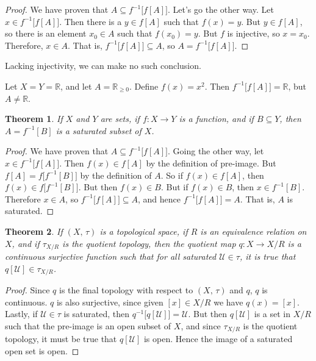 \documentclass{article}
\theoremstyle{plain}
\newtheorem{theorem}{Theorem}[section]
\theoremstyle{normal}
\newenvironment{example}{%
    \pushQED{\qed}\renewcommand{\qedsymbol}{$\blacksquare$}\examplex%
}{%
    \popQED\endexamplex%
}
\begin{document}
        \begin{proof}
            We have proven that $A\subseteq{f}^{-1}\big[f[A]\big]$. Let's go
            the other way. Let $x\in{f}^{-1}\big[f[A]\big]$. Then there is
            a $y\in{f}[A]$ such that $f(x)=y$. But $y\in{f}[A]$, so there is an
            element $x_{0}\in{A}$ such that $f(x_{0})=y$. But $f$ is injective,
            so $x=x_{0}$. Therefore, $x\in{A}$. That is,
            $f^{-1}\big[f[A]\big]\subseteq{A}$, so
            $A=f^{-1}\big[f[A]\big]$.
        \end{proof}
        Lacking injectivity, we can make no such conclusion.
        \begin{example}
            Let $X=Y=\mathbb{R}$, and let $A=\mathbb{R}_{\geq{0}}$. Define
            $f(x)=x^{2}$. Then
            $f^{-1}\big[f[A]\big]=\mathbb{R}$, but $A\ne\mathbb{R}$.
        \end{example}
        \begin{theorem}
            If $X$ and $Y$ are sets, if $f:X\rightarrow{Y}$ is a function,
            and if $B\subseteq{Y}$, then $A=f^{-1}[B]$ is a saturated subset
            of $X$.
        \end{theorem}
        \begin{proof}
            We have proven that $A\subseteq{f}^{-1}\big[f[A]\big]$. Going the
            other way, let $x\in{f}^{-1}\big[f[A]\big]$. Then
            $f(x)\in{f}[A]$ by the definition of pre-image. But
            $f[A]=f\big[f^{-1}[B]\big]$ by the definition of $A$. So if
            $f(x)\in{f}[A]$, then $f(x)\in{f}\big[f^{-1}[B]\big]$. But then
            $f(x)\in{B}$. But if $f(x)\in{B}$, then $x\in{f}^{-1}[B]$. Therefore
            $x\in{A}$, so $f^{-1}\big[f[A]\big]\subseteq{A}$, and hence
            $f^{-1}\big[f[A]\big]=A$. That is, $A$ is saturated.
        \end{proof}
        \begin{theorem}
            If $(X,\,\tau)$ is a topological space, if $R$ is an equivalence
            relation on $X$, and if $\tau_{X/R}$ is the quotient topology,
            then the quotient map $q:X\rightarrow{X}/R$ is a continuous
            surjective function such that for all saturated
            $\mathcal{U}\in\tau$, it is true that $q[\mathcal{U}]\in\tau_{X/R}$.
        \end{theorem}
        \begin{proof}
            Since $q$ is the final topology with respect to $(X,\,\tau)$ and
            $q$, $q$ is continuous. $q$ is also surjective, since given
            $[x]\in{X}/R$ we have $q(x)=[x]$. Lastly, if $\mathcal{U}\in\tau$
            is saturated, then
            $q^{-1}\big[q[\mathcal{U}]\big]=\mathcal{U}$. But then
            $q[\mathcal{U}]$ is a set in $X/R$ such that the pre-image is an
            open subset of $X$, and since $\tau_{X/R}$ is the quotient topology,
            it must be true that $q[\mathcal{U}]$ is open. Hence the image of
            a saturated open set is open.
        \end{proof}
\end{document}

